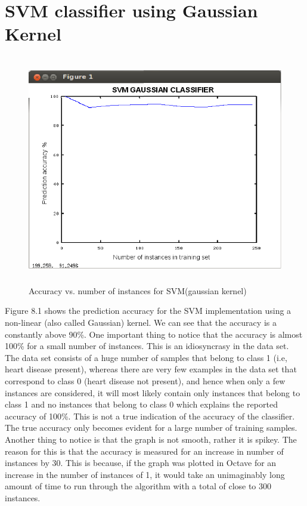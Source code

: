 \documentclass[11pt,a4paper]{report}
\begin{document}
{\section{SVM classifier using Gaussian Kernel}

\begin{figure}[H]
\begin{center}
\includegraphics[width=13cm, height=10cm]{svmg.png}
\captionsetup{width=13cm}
\caption{Accuracy vs. number of instances for SVM(gaussian kernel)}
\end{center}
\end{figure}

Figure 8.1 shows the prediction accuracy for the SVM implementation using a non-linear (also called Gaussian) kernel. We can see that the accuracy is a constantly above 90\%. One important thing to notice that the accuracy is almost 100\% for a small number of instances. This is an idiosyncrasy in the data set. The data set consists of a huge number of samples that belong to class 1 (i.e, heart disease present), whereas there are very few examples in the data set that correspond to class 0 (heart disease not present), and hence when only a few instances are considered, it will most likely contain only instances that belong to class 1 and no instances that belong to class 0 which explains the reported accuracy of 100\%. This is not a true indication of the accuracy of the classifier. The true accuracy only becomes evident for a large number of training samples. Another thing to notice is that the graph is not smooth, rather it is spikey. The reason for this is that the accuracy is measured for an increase in number of instances by 30. This is because, if the graph was plotted in Octave for an increase in the number of instances of 1, it would take an unimaginably long amount of time to run through the algorithm with a total of close to 300 instances.\\

}
\end{document}
